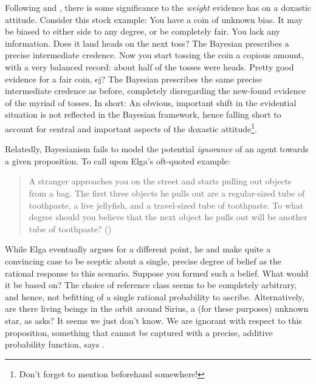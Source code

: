 \documentclass[11pt, a4paper]{scrartcl}
\begin{document}
Following \citet{Joyce2005-JOYHPR} and \citet{sep-imprecise-probabilities}, there is some significance to the \emph{weight} evidence has on a doxastic attitude. Consider this stock example: You have a coin of unknown bias. It may be biased to either side to any degree, or be completely fair. You lack any information. Does it land heads on the next toss? The Bayesian prescribes a precise intermediate credence. Now you start tossing the coin a copious amount, with a very balanced record: about half of the tosses were heads. Pretty good evidence for a fair coin, ej? The Bayesian prescribes the same precise intermediate credence as before, completely disregarding the new-found evidence of the myriad of tosses. In short: An obvious, important shift in the evidential situation is not reflected in the Bayesian framework, hence falling short to account for central and important aspects of the doxastic attitude\footnote{Don't forget to mention beforehand somewhere!}. 

Relatedly, Bayesianism fails to model the potential \emph{ignorance} of an agent towards a given proposition. To call upon Elga's oft-quoted example:
\begin{quote}
A stranger approaches you on the street and starts pulling out objects from a bag. The first three objects he pulls out are a regular-sized tube of toothpaste, a live jellyfish, and a travel-sized tube of toothpaste. To what degree should you believe that the next object he pulls out will be another tube of toothpaste?
(\citet{Elga2010-ELGSPS})
\end{quote}
While Elga eventually argues for a different point, he and \citet{sep-imprecise-probabilities} make quite a convincing case to be sceptic about a single, precise degree of belief as the rational response to this scenario. Suppose you formed such a belief. What would it be based on? The choice of reference class seems to be completely arbitrary, and hence, not befitting of a single rational probability to ascribe. Alternatively, are there living beings in the orbit around Sirius, a (for these purposes) unknown star, as \citet{Shafer1976-SHAAMT} asks? It seems we just don't know. We are ignorant with respect to this proposition, something that cannot be captured with a precise, additive probability function, says \citet{Norton2011-NORCTB}.
\end{document}
